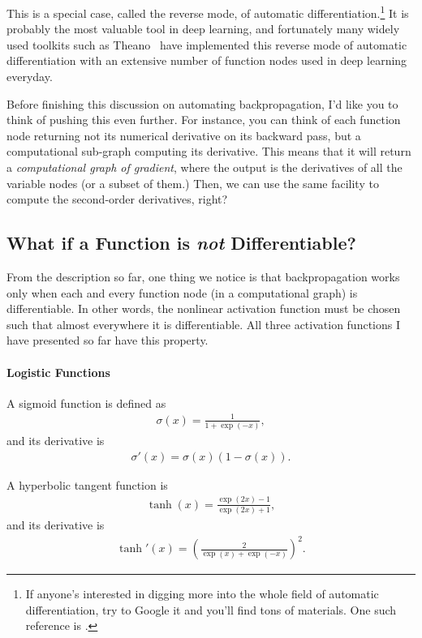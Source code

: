 \documentclass{report}
\begin{document}
This is a special case, called the reverse mode, of automatic
differentiation.\footnote{
    If anyone's interested in digging more into the whole field of automatic
    differentiation, try to Google it and you'll find tons of materials. One
    such reference is \cite{baydin2015automatic}.
} It is probably the most valuable tool in deep learning, and fortunately many
widely used toolkits such as Theano~\cite{bergstra2010theano,bastien2012theano}
have implemented this reverse mode of automatic differentiation with an
extensive number of function nodes used in deep learning everyday.

Before finishing this discussion on automating backpropagation, I'd like you to
think of pushing this even further. For instance, you can think of each function
node returning not its numerical derivative on its backward pass, but a
computational sub-graph computing its derivative. This means that it will return
a {\em computational graph of gradient}, where the output is the derivatives of
all the variable nodes (or a subset of them.) Then, we can use the same facility
to compute the second-order derivatives, right? 

\subsection{What if a Function is {\em not} Differentiable?}
\label{sec:nonlinearities}

From the description so far, one thing we notice is that backpropagation works
only when each and every function node (in a computational graph) is
differentiable. In other words, the nonlinear activation function must be chosen
such that almost everywhere it is differentiable. All three activation functions
I have presented so far have this property.

\paragraph{Logistic Functions}
A sigmoid function is defined as
\begin{align*}
    \sigma(x) = \frac{1}{1+\exp(-x)},
\end{align*}
and its derivative is
\begin{align*}
    \sigma'(x) = \sigma(x) (1 - \sigma(x)).
\end{align*}

A hyperbolic tangent function is
\begin{align*}
    \tanh(x) =  \frac{\exp(2x) -1}{\exp(2x) + 1},
\end{align*}
and its derivative is 
\begin{align*}
    \tanh'(x) = \left(\frac{2}{\exp(x)+\exp(-x)}\right)^2.
\end{align*}
\end{document}
